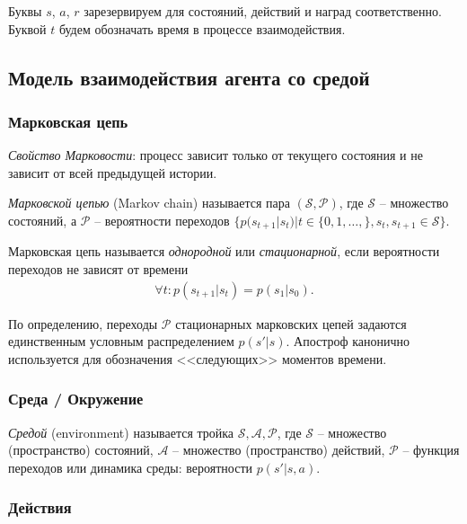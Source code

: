 \documentclass[%
	11pt,
	a4paper,
	utf8,
		]{article}
\begin{document}
Буквы $ s $, $ a $, $ r $ зарезервируем для состояний, действий и наград соответственно. Буквой $ t $ будем обозначать время в процессе взаимодействия.

\subsection{Модель взаимодействия агента со средой}

\subsubsection{Марковская цепь}

\emph{Свойство Марковости}: процесс зависит только от текущего состояния и не зависит от всей предыдущей истории. 

\emph{Марковской цепью} (Markov chain) называется пара $ (\mathcal{S}, \mathcal{P}) $, где $ \mathcal{S} $ -- множество состояний, а $ \mathcal{P} $ -- вероятности переходов $ \{ p(s_{t+1} | s_t) | t \in \{0, 1, \ldots, \}, s_t, s_{t+1} \in \mathcal{S} \} $.

Марковская цепь называется \emph{однородной} или \emph{стационарной}, если вероятности переходов не зависят от времени
\begin{align*}
	\forall t: p(s_{t+1} | s_t) = p(s_1 | s_0).
\end{align*}

По определению, переходы $ \mathcal{P} $ стационарных марковских цепей задаются единственным условным распределением $ p(s' | s) $. Апостроф канонично используется для обозначения <<следующих>> моментов времени.

\subsubsection{Среда / Окружение}

\emph{Средой} (environment) называется тройка $ \mathcal{S}, \mathcal{A}, \mathcal{P} $, где $ \mathcal{S} $ -- множество (пространство) состояний, $ \mathcal{A} $ -- множество (пространство) действий, $ \mathcal{P} $ -- функция переходов или динамика среды: вероятности $ p(s' | s, a) $.


\subsubsection{Действия}
\end{document}
